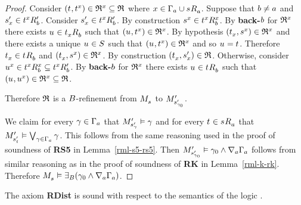 \begin{proof}
Consider $(\kStateT, \kStateT[x]) \in \refinement^x \subseteq \refinement$ where $x \in \Gamma_\agentA \cup \kSuccessorsA{\kStateS}$.
Suppose that $\agentB \neq \agentA$ and $\kStateSP_x \in \kSuccessorsPB{\kStateT[x]}$.
Consider $\kStateSP_x \in \kSuccessorsPB{\kStateT[x]}$.
By construction $\kStateS[x] \in \kSuccessorsB[x]{\kStateT[x]}$.
By {\bf back-$\agentB$} for $\refinement^x$ there exists $\kStateU \in \kSuccessorsB{\kStateT_x}$ such that $(\kStateU, \kStateT[x]) \in \refinement^x$.
By hypothesis $(\kStateT_x, \kStateS[x]) \in \refinement^x$ and there exists a unique $\kStateU \in \kStates$ such that $(\kStateU, \kStateT[x]) \in \refinement^x$ and so $\kStateU = \kStateT$.
Therefore $\kStateT_x \in \kSuccessorsB{\kStateT}$ and $(\kStateT_x, \kStateS[x]) \in \refinement^x$.
By construction $(\kStateT_x, \kStateSP_x) \in \refinement$.
Otherwise, consider $\kStateU[x] \in \kSuccessorsB[x]{\kStateT[x]} \subseteq \kSuccessorsPB{\kStateT[x]}$.
By {\bf back-$\agentB$} for $\refinement^x$ there exists $\kStateU \in \kSuccessorsB{\kStateT}$ such that $(\kStateU, \kStateU[x]) \in \refinement^x \subseteq \refinement$.

Therefore $\refinement$ is a $\agentsB$-refinement from $\kPModel{\kStateS}$ to $\kPModelP{\kStateSP_{\gamma_0}}$.

We claim for every $\gamma \in \Gamma_\agentA$ that $\kPModelP{\kStateSP_\gamma} \entails \gamma$ and for every $\kStateT \in \kSuccessorsA{\kStateS}$ that $\kPModelP{\kStateSP_{\kStateT}} \entails \bigvee_{\gamma \in \Gamma_\agentA} \gamma$.
This follows from the same reasoning used in the proof of soundness of {\bf RS5} in Lemma~\ref{rml-s5-rs5}.
Then $\kPModelP{\kStateSP_{\gamma_0}} \entails \gamma_0 \land \coversA \Gamma_\agentA$ follows from similar reasoning as in the proof of soundness of {\bf RK} in Lemma~\ref{rml-k-rk}.
Therefore $\kPModel{\kStateS} \entails \somerefsBs (\gamma_0 \land \coversA \Gamma_\agentA)$.
\end{proof}

\begin{lemma}
The axiom {\bf RDist} is sound with respect to the semantics of the logic \logicRmlS{}.
\end{lemma}

